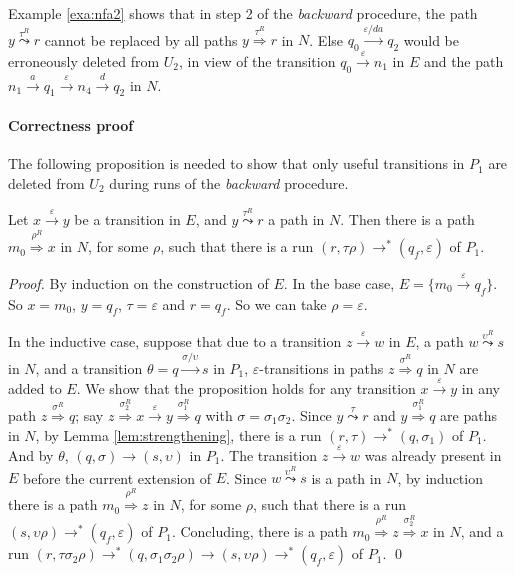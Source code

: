 \documentclass{llncs}
\newcommand{\eps}{\ensuremath{\varepsilon}}
\begin{document}
Example \ref{exa:nfa2} shows that in step 2 of the {\em backward} procedure,
the path $y\stackrel{\tau^R}{\leadsto}r$ cannot be replaced by all paths $y\stackrel{\tau^R}{\Rightarrow}r$ in $N$.
Else $q_0\stackrel{\eps/da}{\rightarrow}q_2$ would be erroneously deleted from $U_2$, in view of
the transition $q_0\stackrel{\eps}{\rightarrow}n_1$ in $E$ and
the path $n_1\stackrel{a}{\rightarrow}q_1\stackrel{\eps}{\rightarrow}n_4\stackrel{d}{\rightarrow}q_2$ in $N$.

\paragraph{Correctness proof}
The following proposition is needed to show that only useful transitions in $P_1$ are deleted from $U_2$ during runs
of the {\em backward} procedure.

\vspace*{-2mm}

\begin{proposition}
\label{prop:nfa2}
Let $x\stackrel{\eps}{\rightarrow}y$ be a transition in $E$, and $y\stackrel{\tau^R}{\leadsto}r$ a path in $N$.
Then there is a path $m_0\stackrel{\rho^R}{\Rightarrow}x$ in $N$, for some $\rho$, such that
there is a run $(r,\tau\rho)\rightarrow^*(q_f,\eps)$ of $P_1$.
\end{proposition}

\begin{proof}
By induction on the construction of $E$.
In the base case, $E=\{m_0\stackrel{\eps}{\rightarrow}q_f\}$. So $x=m_0$, $y=q_f$, $\tau=\eps$ and $r=q_f$.
So we can take $\rho=\eps$.

In the inductive case, suppose that due to a transition $z\stackrel{\eps}{\rightarrow}w$ in $E$, a path $w\stackrel{\upsilon^R}{\leadsto}s$ in $N$,
and a transition $\theta=q\stackrel{\sigma/\upsilon}{\rightarrow}s$ in $P_1$,
$\eps$-transitions in paths $z\stackrel{\sigma^R}{\Rightarrow}q$ in $N$ are added to $E$.
We show that the proposition holds for any transition $x\stackrel{\eps}{\rightarrow}y$ in any path $z\stackrel{\sigma^R}{\Rightarrow}q$;
say $z\stackrel{\sigma_2^R}{\Rightarrow}x\stackrel{\eps}{\rightarrow}y\stackrel{\sigma_1^R}{\Rightarrow}q$ with $\sigma=\sigma_1\sigma_2$.
Since $y\stackrel{\tau}{\leadsto}r$ and $y\stackrel{\sigma_1^R}{\Rightarrow}q$ are paths in $N$, by Lemma \ref{lem:strengthening},
there is a run $(r,\tau)\rightarrow^*(q,\sigma_1)$ of $P_1$. And by $\theta$, $(q,\sigma)\rightarrow(s,\upsilon)$ in $P_1$.
The transition $z\stackrel{\eps}{\rightarrow}w$ was already present in $E$ before the current extension of $E$.
Since $w\stackrel{\upsilon^R}{\leadsto}s$ is a path in $N$, by induction there is a path $m_0\stackrel{\rho^R}{\Rightarrow}z$ in $N$, for some $\rho$,
such that there is a run $(s,\upsilon\rho)\rightarrow^*(q_f,\eps)$ of $P_1$.
Concluding, there is a path $m_0\stackrel{\rho^R}{\Rightarrow}z\stackrel{\sigma_2^R}{\Rightarrow}x$ in $N$,
and a run $(r,\tau\sigma_2\rho)\rightarrow^*(q,\sigma_1\sigma_2\rho)\rightarrow(s,\upsilon\rho)\rightarrow^*(q_f,\eps)$ of $P_1$.
\qed
\end{proof}
\end{document}
